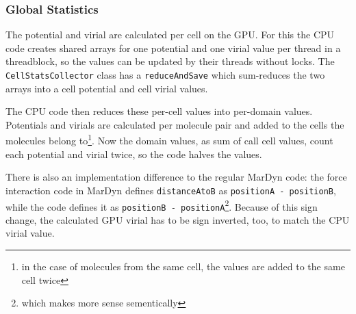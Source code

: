 \subsubsection{Global Statistics}
The potential and virial are calculated per cell on the GPU. For this the CPU code creates shared arrays for one potential and one virial value per thread in a threadblock, so the values can be updated by their threads without locks. The \lstinline!CellStatsCollector! class has a \lstinline!reduceAndSave! which sum-reduces the two arrays into a cell potential and cell virial values.

The CPU code then reduces these per-cell values into per-domain values. Potentials and virials are calculated per molecule pair and added to the cells the molecules belong to\footnote{in the case of molecules from the same cell, the values are added to the same cell twice}. Now the domain values, as sum of call cell values, count each potential and virial twice, so the code halves the values.

There is also an implementation difference to the regular MarDyn code: the force interaction code in MarDyn defines \lstinline!distanceAtoB! as \lstinline!positionA - positionB!, while the \cuda{} code defines it as \lstinline!positionB - positionA!\footnote{which makes more sense sementically}. Because of this sign change, the calculated GPU virial has to be sign inverted, too, to match the CPU virial value.

